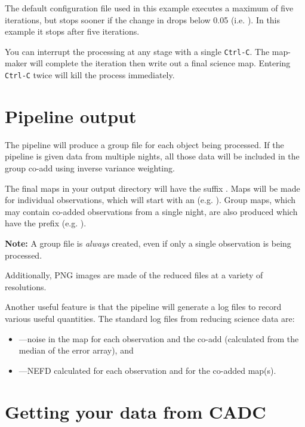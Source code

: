 The default configuration file used in this example executes a maximum
of five iterations, but stops sooner if the change in 
drops below 0.05 (i.e. ). In this example it
stops after five iterations.



\begin{tip}
  You can interrupt the processing at any stage with a single
  \texttt{Ctrl-C}. The map-maker will complete the iteration then
  write out a final science map. Entering \texttt{Ctrl-C} twice will
  kill the process immediately.
\end{tip}

\section{Pipeline output}

The pipeline will produce a group file for each object being
processed. If the pipeline is given data from multiple nights, all
those data will be included in the group co-add using inverse variance
weighting.

The final maps in your output directory will have the suffix
. Maps will be made for individual observations, which
will start with an  (e.g.
). Group maps, which may
contain co-added observations from a single night, are also produced
which have the prefix 
(e.g. ).

\textbf{Note:} A group file is \emph{always} created, even if only a
single observation is being processed.

Additionally, PNG images are made of the reduced files at a variety of
resolutions.

Another useful feature is that the pipeline will generate a log files
to record various useful quantities. The standard log files from
reducing science data are:

\begin{itemize}
\item {}---noise in the map for each observation and the co-add
(calculated from the median of the error array), and
\item {}---NEFD calculated for each observation and for
the co-added map(s).
\end{itemize}

\section{Getting your data from CADC}

